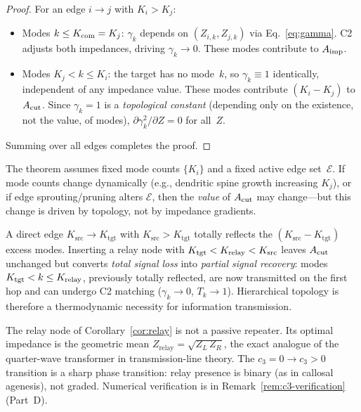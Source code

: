 \documentclass[aps,pre,twocolumn,superscriptaddress,floatfix]{revtex4-2}
\begin{document}
\begin{proof}
For an edge $i \to j$ with $K_i > K_j$:
\begin{itemize}
\item
Modes $k \le K_{\text{com}} = K_j$:
$\gamma_k$ depends on $(Z_{i,k}, Z_{j,k})$ via
Eq.~\eqref{eq:gamma}.
C2 adjusts both impedances, driving $\gamma_k \to 0$.
These modes contribute to $A_{\text{imp}}$.

\item
Modes $K_j < k \le K_i$:
the target has no mode~$k$, so $\gamma_k \equiv 1$
identically, independent of any impedance value.
These modes contribute $(K_i - K_j)$ to $A_{\text{cut}}$.
Since $\gamma_k = 1$ is a \emph{topological constant}
(depending only on the existence, not the value, of modes),
$\partial \gamma_k^2 / \partial Z = 0$ for all~$Z$.
\end{itemize}
Summing over all edges completes the proof.
\end{proof}

\begin{remark}
The theorem assumes fixed mode counts $\{K_i\}$ and a fixed
active edge set~$\mathcal{E}$.
If mode counts change dynamically (e.g., dendritic spine
growth increasing $K_j$), or if edge sprouting/pruning
alters $\mathcal{E}$, then the \emph{value} of $A_{\text{cut}}$
may change---but this change is driven by topology, not
by impedance gradients.
\end{remark}

\begin{corollary}
\label{cor:relay}
A direct edge $K_{\text{src}} \to K_{\text{tgt}}$ with
$K_{\text{src}} > K_{\text{tgt}}$ totally reflects the
$(K_{\text{src}} - K_{\text{tgt}})$ excess modes.
Inserting a relay node with
$K_{\text{tgt}} < K_{\text{relay}} < K_{\text{src}}$ leaves $A_{\text{cut}}$
unchanged but converts \emph{total signal loss} into
\emph{partial signal recovery}:
modes $K_{\text{tgt}} < k \le K_{\text{relay}}$, previously
totally reflected, are now transmitted on the first hop
and can undergo C2 matching ($\gamma_k \to 0$,
$T_k \to 1$).
Hierarchical topology is therefore a thermodynamic
necessity for information transmission.
\end{corollary}

\begin{remark}
\label{rem:quarter-wave}
The relay node of Corollary~\ref{cor:relay} is not a
passive repeater.
Its optimal impedance is the geometric mean
$Z_{\text{relay}} = \sqrt{Z_L \, Z_R}$,
the exact analogue of the quarter-wave transformer
in transmission-line theory.
The $c_3 = 0 \to c_3 > 0$ transition is a sharp
phase transition: relay presence is binary
(as in callosal agenesis), not graded.
Numerical verification is in
Remark~\ref{rem:c3-verification} (Part~D).
\end{remark}
\end{document}
